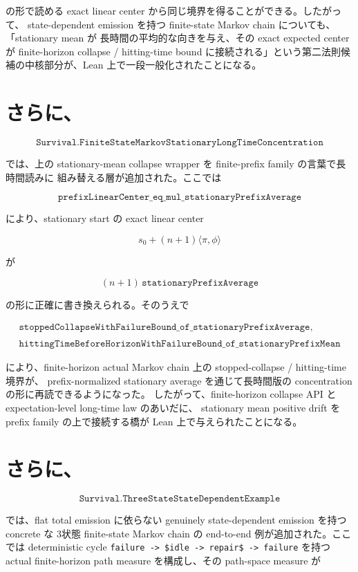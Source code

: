 \documentclass[12pt,a4paper]{article}
\begin{document}
の形で読める exact linear center から同じ境界を得ることができる。したがって、 state-dependent emission を持つ finite-state Markov chain についても、「stationary mean が 長時間の平均的な向きを与え、その exact expected center が finite-horizon collapse / hitting-time bound に接続される」という第二法則候補の中核部分が、Lean 上で一段一般化されたことになる。

\section{さらに、}\label{ux3055ux3089ux306b-8}

\[
\texttt{Survival.FiniteStateMarkovStationaryLongTimeConcentration}
\]

では、上の stationary-mean collapse wrapper を finite-prefix family の言葉で長時間読みに 組み替える層が追加された。ここでは

\[
\texttt{prefixLinearCenter\_eq\_mul\_stationaryPrefixAverage}
\]

により、stationary start の exact linear center

\[
s_0 + (n+1)\langle \pi,\phi\rangle
\]

が

\[
(n+1)\,\texttt{stationaryPrefixAverage}
\]

の形に正確に書き換えられる。そのうえで

\[
\begin{aligned}
\texttt{stoppedCollapseWithFailureBound\_of\_stationaryPrefixAverage}, \\
\qquad \\
\texttt{hittingTimeBeforeHorizonWithFailureBound\_of\_stationaryPrefixMean}
\end{aligned}
\]

により、finite-horizon actual Markov chain 上の stopped-collapse / hitting-time 境界が、 prefix-normalized stationary average を通じて長時間版の concentration の形に再読できるようになった。 したがって、finite-horizon collapse API と expectation-level long-time law のあいだに、 stationary mean positive drift を prefix family の上で接続する橋が Lean 上で与えられたことになる。

\section{さらに、}\label{ux3055ux3089ux306b-9}

\[
\texttt{Survival.ThreeStateStateDependentExample}
\]

では、flat total emission に依らない genuinely state-dependent emission を持つ concrete な 3状態 finite-state Markov chain の end-to-end 例が追加された。ここでは deterministic cycle \texttt{failure\ -\textgreater{}\ \$idle\ -\textgreater{}\ repair\$\ -\textgreater{}\ failure} を持つ actual finite-horizon path measure を構成し、その path-space measure が
\end{document}
